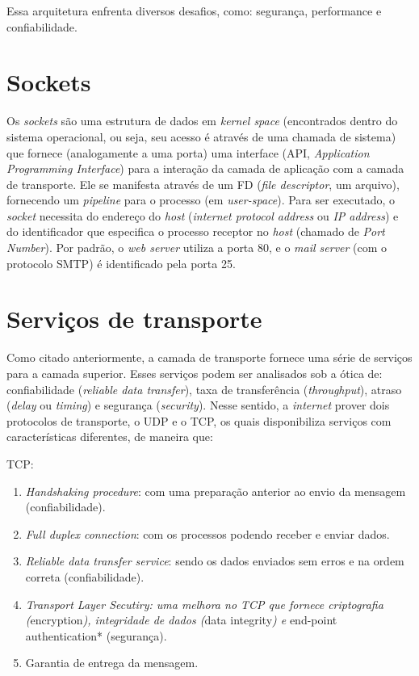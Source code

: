 Essa arquitetura enfrenta diversos desafios, como: segurança, performance
e confiabilidade.

\hypertarget{sockets}{%
\section{Sockets}\label{sockets}}

Os \emph{sockets} são uma estrutura de dados em \emph{kernel space}
(encontrados dentro do sistema operacional, ou seja, seu acesso é
através de uma chamada de sistema) que fornece (analogamente a uma
porta) uma interface (API, \emph{Application Programming Interface})
para a interação da camada de aplicação com a camada de transporte. Ele
se manifesta através de um FD (\emph{file descriptor}, um arquivo),
fornecendo um \emph{pipeline} para o processo (em \emph{user-space}).
Para ser executado, o \emph{socket} necessita do endereço do \emph{host}
(\emph{internet protocol address} ou \emph{IP address}) e do
identificador que especifica o processo receptor no \emph{host} (chamado
de \emph{Port Number}). Por padrão, o \emph{web server} utiliza a porta
80, e o \emph{mail server} (com o protocolo SMTP) é identificado pela
porta 25.

\hypertarget{serviuxe7os-de-transporte}{%
\section{Serviços de transporte}\label{serviuxe7os-de-transporte}}

Como citado anteriormente, a camada de transporte fornece uma série de
serviços para a camada superior. Esses serviços podem ser analisados sob
a ótica de: confiabilidade (\emph{reliable data transfer}), taxa de
transferência (\emph{throughput}), atraso (\emph{delay} ou \emph{timing})
e segurança (\emph{security}). Nesse sentido, a \emph{internet} prover
dois protocolos de transporte, o UDP e o TCP, os quais disponibiliza
serviços com características diferentes, de maneira que:

TCP:

\begin{enumerate}
\def\labelenumi{\arabic{enumi}.}
\tightlist
\item
  \emph{Handshaking procedure}: com uma preparação anterior ao envio da
  mensagem (confiabilidade).
\item
  \emph{Full duplex connection}: com os processos podendo receber e
  enviar dados.
\item
  \emph{Reliable data transfer service}: sendo os dados enviados sem
  erros e na ordem correta (confiabilidade).
\item
  \emph{Transport Layer Secutiry: uma melhora no TCP que fornece
  criptografia (}encryption\emph{), integridade de dados (}data
  integrity\emph{) e }end-point authentication* (segurança).
\item
  Garantia de entrega da mensagem.
\end{enumerate}

